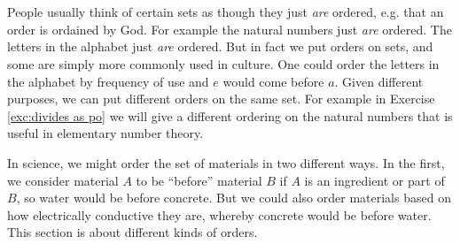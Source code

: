

\section{}\label{sec:orders}

\begin{blockENG}
People usually think of certain sets as though they just {\em are} ordered, e.g. that an order is ordained by God. For example the natural numbers just {\em are} ordered. The letters in the alphabet just {\em are} ordered. But in fact we put orders on sets, and some are simply more commonly used in culture. One could order the letters in the alphabet by frequency of use and $e$ would come before $a$. Given different purposes, we can put different orders on the same set. For example in Exercise \ref{exc:divides as po} we will give a different ordering on the natural numbers that is useful in elementary number theory.
\end{blockENG}

\begin{blockRUS}
\end{blockRUS}

\begin{blockENG}
In science, we might order the set of materials in two different ways. In the first, we consider material $A$ to be “before” material $B$ if $A$ is an ingredient or part of $B$, so water would be before concrete. But we could also order materials based on how electrically conductive they are, whereby concrete would be before water. This section is about different kinds of orders.
\end{blockENG}


\subsection{}

